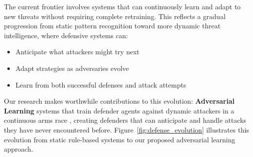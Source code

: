 \documentclass[12pt,oneside]{article}
\newcommand{\kwz}[1]{
  {\color{magenta} [KWZ: {#1}]}
 }
\begin{document}
The current frontier involves systems that can continuously learn and adapt to new threats without requiring complete retraining. This reflects a gradual progression from static pattern recognition toward more dynamic threat intelligence, where defensive systems can:
\begin{itemize}
    \item Anticipate what attackers might try next
    \item Adapt strategies as adversaries evolve
    \item Learn from both successful defenses and attack attempts
\end{itemize}

Our research makes worthwhile contributions to this evolution: \textbf{Adversarial Learning} systems that train defender agents against dynamic attackers in a continuous arms race \cite{sutton2018reinforcement}, creating defenders that can anticipate and handle attacks they have never encountered before. Figure~\ref{fig:defense_evolution} illustrates this evolution from static rule-based systems to our proposed adversarial learning approach.

\end{document}
